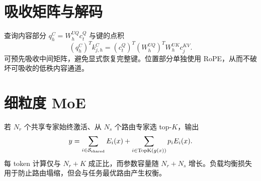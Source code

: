\documentclass[11pt]{article}
\numberwithin{equation}{section}
\newcommand{\1}{\mathbf{1}}
\newcommand{\cS}{\mathcal{S}}
\begin{document}
\section{吸收矩阵与解码}
查询内容部分 $q_h^C=W_h^{UQ}c_t^Q$ 与键的点积
\begin{equation}
  (q_h^C)^Tk_{j,h}^C
  =(c_t^Q)^T(W_h^{UQ})^TW_h^{UK}c_j^{KV}.
\end{equation}
可预先吸收中间矩阵，避免显式恢复完整键。位置部分单独使用 RoPE，从而不破坏可吸收的低秩内容通道。

\section{细粒度 MoE}
若 $N_r$ 个共享专家始终激活、从 $N_s$ 个路由专家选 top-$K$，输出
\begin{equation}
  y=\sum_{i\in\cS_{\rm shared}}E_i(x)
  +\sum_{i\in\operatorname{TopK}(g(x))}p_iE_i(x).
\end{equation}
每 token 计算仅与 $N_r+K$ 成正比，而参数容量随 $N_r+N_s$ 增长。负载均衡损失用于防止路由塌缩，但会与任务最优路由产生权衡。
\end{document}
